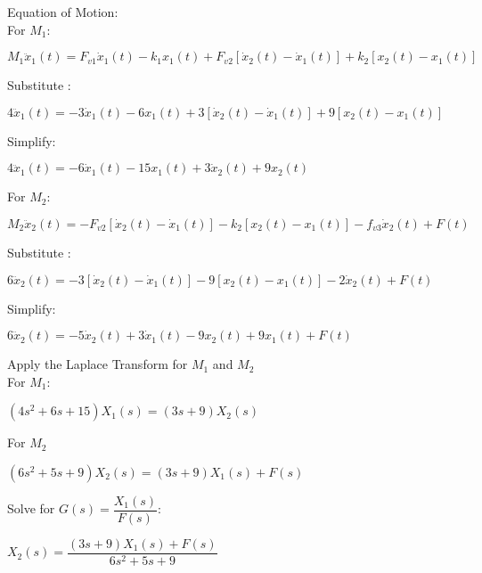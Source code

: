 \documentclass[11pt,letterpaper]{article}
\begin{document}
Equation of Motion:\\[12pt]
For $M_1$:\\
\begin{center}
	$M_1\ddot{x}_1(t)=F_{v1}\dot{x}_1(t)-k_1x_1(t)+F_{v2}[\dot{x}_2(t)-\dot{x}_1(t)]+k_2[x_2(t)-x_1(t)]$\\[12pt]
\end{center}
Substitute :\\
\begin{center}
	$4\ddot{x}_1(t)=-3\dot{x}_1(t)-6x_1(t)+3[\dot{x}_2(t)-\dot{x}_1(t)]+9[x_2(t)-x_1(t)]$\\[12pt]
\end{center}
Simplify:\\
\begin{center}
	$4\ddot{x}_1(t)=-6\dot{x}_1(t)-15x_1(t)+3\dot{x}_2(t)+9x_2(t)$\\[12pt]
\end{center}
For $M_2$:\\
\begin{center}
	$M_2\ddot{x}_2(t)=-F_{v2}[\dot{x}_2(t)-\dot{x}_1(t)]-k_2[x_2(t)-x_1(t)]-f_{v3}\dot{x}_2(t)+F(t)$\\[12pt]
\end{center}
Substitute :\\
\begin{center}
	$6\ddot{x}_2(t)=-3[\dot{x}_2(t)-\dot{x}_1(t)]-9[x_2(t)-x_1(t)]-2\dot{x}_2(t)+F(t)$\\[12pt]
\end{center}
Simplify:\\
\begin{center}
	$6\ddot{x}_2(t)=-5\dot{x}_2(t)+3\dot{x}_1(t)-9x_2(t)+9x_1(t)+F(t)$\\[12pt]
\end{center}
Apply the Laplace Transform for $M_1$ and $M_2$\\[12pt]
For $M_1$:\\[12pt]
\begin{center}
	$(4s^2+6s+15)X_1(s)=(3s+9)X_2(s)$\\
\end{center}
For $M_2$\\
\begin{center}
	$(6s^2+5s+9)X_2(s)=(3s+9)X_1(s)+F(s)$\\[12pt]
\end{center}
Solve for $G(s)=\dfrac{X_1(s)}{F(s)}$:\\
\begin{center}
	$X_2(s)=\dfrac{(3s+9)X_1(s)+F(s)}{6s^2+5s+9}$\\
\end{center}
\end{document}
